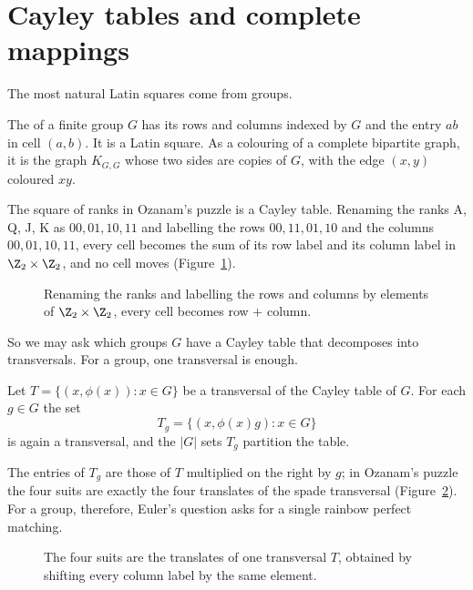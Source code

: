 \section{Cayley tables and complete mappings}\label{sec:complete-mappings}

The most natural Latin squares come from groups.

\begin{definition}\label{def:cayley-table}
The  of a finite group $G$ has its rows and columns indexed by $G$ and the entry $ab$ in cell $(a,b)$. It is a Latin square. As a colouring of a complete bipartite graph, it is the graph $K_{G,G}$ whose two sides are copies of $G$, with the edge $(x,y)$ coloured $xy$.
\end{definition}

The square of ranks in Ozanam's puzzle is a Cayley table. Renaming the ranks A, Q, J, K as $00,01,10,11$ and labelling the rows $00,11,01,10$ and the columns $00,01,10,11$, every cell becomes the sum of its row label and its column label in $\Z_2\times\Z_2$, and no cell moves (Figure~\ref{fig:ranks-cayley}).

\begin{figure}[ht]
\centering

\caption{Renaming the ranks and labelling the rows and columns by elements of $\Z_2\times\Z_2$, every cell becomes row $+$ column.}
\label{fig:ranks-cayley}
\end{figure}

So we may ask which groups $G$ have a Cayley table that decomposes into transversals. For a group, one transversal is enough.

\begin{fact}\label{fact:translates}
Let $T=\{(x,\phi(x)):x\in G\}$ be a transversal of the Cayley table of $G$. For each $g\in G$ the set
\[
T_g=\{(x,\phi(x)g):x\in G\}
\]
is again a transversal, and the $|G|$ sets $T_g$ partition the table.
\end{fact}

The entries of $T_g$ are those of $T$ multiplied on the right by $g$; in Ozanam's puzzle the four suits are exactly the four translates of the spade transversal (Figure~\ref{fig:translates}). For a group, therefore, Euler's question asks for a single rainbow perfect matching.

\begin{figure}[ht]
\centering

\caption{The four suits are the translates of one transversal $T$, obtained by shifting every column label by the same element.}
\label{fig:translates}
\end{figure}

